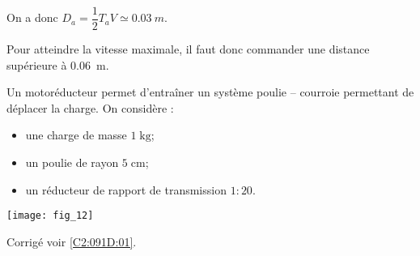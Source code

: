 On a donc $D_a = \dfrac{1}{2}T_a V  \simeq \SI{0,03}{m}$. 

\else
\fi


\ifprof
Pour atteindre la vitesse maximale, il faut donc commander une distance supérieure à \SI{0,06}{m}.
\else
\fi

%

\ifprof

\else
\fi

\ifprof
\else

Un motoréducteur permet d'entraîner un système poulie -- courroie permettant de déplacer la charge. On considère :
\begin{itemize}
\item une charge de masse $1\; \text{kg}$;
\item un poulie de rayon $5\; \text{cm}$;
\item un réducteur de rapport de transmission $1:20$.
\end{itemize}

\begin{center}
\texttt{[image: fig\_12]}
\end{center}

\fi

\ifprof

\else
\fi

\ifprof
\else
\begin{flushright}
\footnotesize{Corrigé  voir \ref{C2:091D:01}.}
\end{flushright}%
\fi


